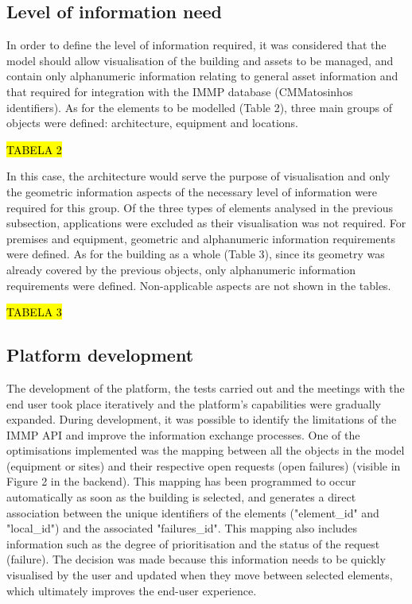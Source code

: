 \subsection{Level of information need}
\label{subsec:loin}

In order to define the level of information required, it was considered that the model should allow visualisation of the building and assets to be managed, and contain only alphanumeric information relating to general asset information and that required for integration with the IMMP database (CMMatosinhos identifiers). As for the elements to be modelled (Table 2), three main groups of objects were defined: architecture, equipment and locations.

\hl{TABELA 2}

In this case, the architecture would serve the purpose of visualisation and only the geometric information aspects of the necessary level of information were required for this group. Of the three types of elements analysed in the previous subsection, applications were excluded as their visualisation was not required. For premises and equipment, geometric and alphanumeric information requirements were defined. As for the building as a whole (Table 3), since its geometry was already covered by the previous objects, only alphanumeric information requirements were defined. Non-applicable aspects are not shown in the tables.

\hl{TABELA 3}

\subsection{Platform development}
\label{subsec:platform}

The development of the platform, the tests carried out and the meetings with the end user took place iteratively and the platform's capabilities were gradually expanded. During development, it was possible to identify the limitations of the IMMP API and improve the information exchange processes. One of the optimisations implemented was the mapping between all the objects in the model (equipment or sites) and their respective open requests (open failures) (visible in Figure 2 in the backend). This mapping has been programmed to occur automatically as soon as the building is selected, and generates a direct association between the unique identifiers of the elements ("element\_id" and "local\_id") and the associated "failures\_id". This mapping also includes information such as the degree of prioritisation and the status of the request (failure). The decision was made because this information needs to be quickly visualised by the user and updated when they move between selected elements, which ultimately improves the end-user experience.

